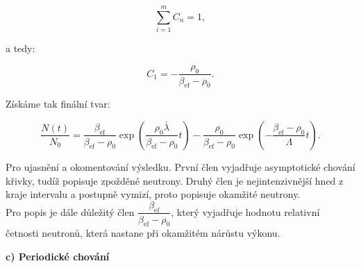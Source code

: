 $$ \sum_{i = 1}^m C_n = 1, $$

a tedy:

$$ C_1 = -\dfrac{\rho_0}{\beta_{\text{ef}} - \rho_0}. $$

Získáme tak finální tvar:

\begin{equation}
  \boxed{
  \dfrac{N(t)}{N_0} = \dfrac{\beta_{\text{ef}}}{\beta_{\text{ef}} - \rho_0} \exp{\left ( \dfrac{\rho_0 \bar{\lambda}}{\beta_{\text{ef}} - \rho_0}t \right ) } - \dfrac{\rho_0}{\beta_{\text{ef}} - \rho_0} \exp{\left ( -\dfrac{\beta_{\text{ef}} - \rho_0}{\Lambda}t \right )}.
  \label{prechodova_charakteristika_priklad}}
\end{equation}

Pro ujasnění a okomentování výsledku. První člen vyjadřuje asymptotické chování křivky, tudíž popisuje zpožděné neutrony. Druhý člen je nejintenzivnější hned z kraje intervalu a postupně vymizí, proto popisuje okamžité neutrony.\\

Pro popis je dále důležitý člen $\dfrac{\beta_{\text{ef}}}{\beta_{\text{ef}} - \rho_0}$, který vyjadřuje hodnotu relativní četnosti neutronů, která nastane při okamžitém nárůstu výkonu.\\

\normalsize

\textbf{c) Periodické chování}
